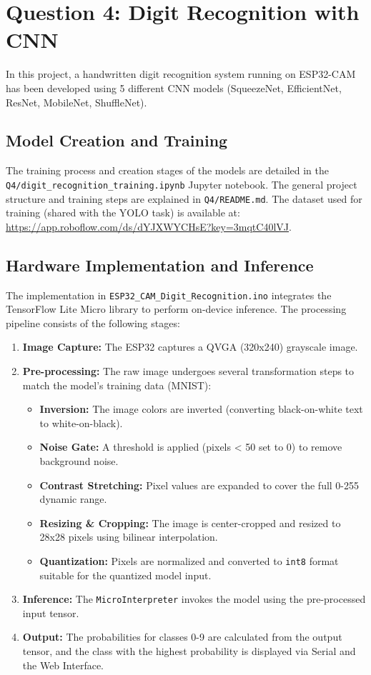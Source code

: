 \section{Question 4: Digit Recognition with CNN}

In this project, a handwritten digit recognition system running on ESP32-CAM has been developed using 5 different CNN models (SqueezeNet, EfficientNet, ResNet, MobileNet, ShuffleNet).

\subsection{Model Creation and Training}
The training process and creation stages of the models are detailed in the \texttt{Q4/digit\_recognition\_training.ipynb} Jupyter notebook. The general project structure and training steps are explained in \texttt{Q4/README.md}. The dataset used for training (shared with the YOLO task) is available at: \url{https://app.roboflow.com/ds/dYJXWYCHsE?key=3mqtC40lVJ}.

\subsection{Hardware Implementation and Inference}
The implementation in \texttt{ESP32\_CAM\_Digit\_Recognition.ino} integrates the TensorFlow Lite Micro library to perform on-device inference. The processing pipeline consists of the following stages:

\begin{enumerate}
    \item \textbf{Image Capture:} The ESP32 captures a QVGA (320x240) grayscale image.
    \item \textbf{Pre-processing:} The raw image undergoes several transformation steps to match the model's training data (MNIST):
    \begin{itemize}
        \item \textbf{Inversion:} The image colors are inverted (converting black-on-white text to white-on-black).
        \item \textbf{Noise Gate:} A threshold is applied (pixels < 50 set to 0) to remove background noise.
        \item \textbf{Contrast Stretching:} Pixel values are expanded to cover the full 0-255 dynamic range.
        \item \textbf{Resizing & Cropping:} The image is center-cropped and resized to 28x28 pixels using bilinear interpolation.
        \item \textbf{Quantization:} Pixels are normalized and converted to \texttt{int8} format suitable for the quantized model input.
    \end{itemize}
    \item \textbf{Inference:} The \texttt{MicroInterpreter} invokes the model using the pre-processed input tensor.
    \item \textbf{Output:} The probabilities for classes 0-9 are calculated from the output tensor, and the class with the highest probability is displayed via Serial and the Web Interface.
\end{enumerate}

